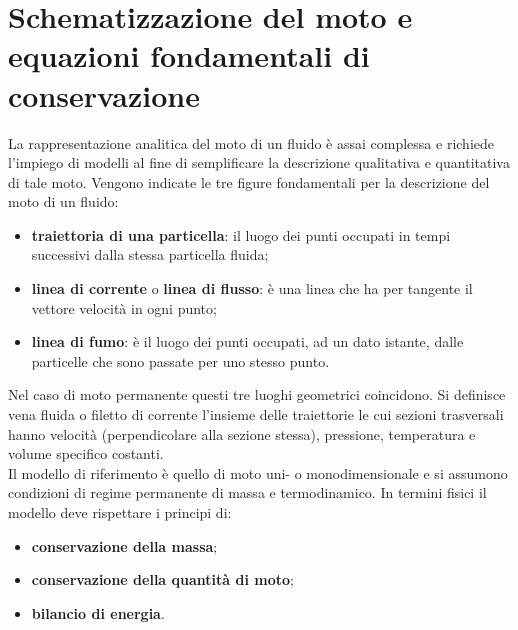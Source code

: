 \section[Moto e equazioni fondamentali]{Schematizzazione del moto e equazioni fondamentali di conservazione}
La rappresentazione analitica del moto di un fluido è assai complessa e richiede l'impiego di modelli al fine di semplificare la descrizione qualitativa e quantitativa di tale moto. Vengono indicate le tre figure fondamentali per la descrizione del moto di un fluido:
\begin{itemize}
\item \textbf{traiettoria di una particella}: il luogo dei punti occupati in tempi successivi dalla stessa particella fluida;
\item \textbf{linea di corrente} o \textbf{linea di flusso}: è una linea che ha per tangente il vettore velocità in ogni punto;
\item \textbf{linea di fumo}: è il luogo dei punti occupati, ad un dato istante, dalle particelle che sono passate per uno stesso punto.
\end{itemize}
Nel caso di moto permanente questi  tre luoghi geometrici coincidono. Si definisce vena fluida o filetto di corrente l'insieme delle traiettorie le cui sezioni trasversali hanno velocità (perpendicolare alla sezione stessa), pressione, temperatura e volume specifico costanti.\\
Il modello di riferimento è quello di moto uni- o monodimensionale e si assumono condizioni di regime permanente di massa e termodinamico. In termini fisici il modello deve rispettare i principi di:
\begin{itemize}
\item \textbf{conservazione della massa};
\item \textbf{conservazione della quantità di moto};
\item \textbf{bilancio di energia}.
\end{itemize}

